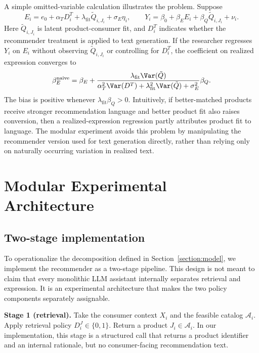 \documentclass[11pt]{article}
\newcommand{\J}{J}
\newcommand{\Y}{Y}
\newcommand{\X}{X}
\newcommand{\Qreg}{D^J}
\newcommand{\catalog}{\mathcal{A}}
\begin{document}
A simple omitted-variable calculation illustrates the problem. Suppose
\begin{equation*}
E_i = e_0 + \alpha_T D_i^T + \lambda_{\mathrm{fit}}\tilde{Q}_{i,\J_i} + \sigma_E\eta_i, \qquad \Y_i = \beta_0 + \beta_E E_i + \beta_Q \tilde{Q}_{i,\J_i} + \nu_i.
\end{equation*}
Here $\tilde{Q}_{i,\J_i}$ is latent product-consumer fit, and $D_i^T$ indicates whether the recommender treatment is applied to text generation. If the researcher regresses $\Y_i$ on $E_i$ without observing $\tilde{Q}_{i,\J_i}$ or controlling for $D_i^T$, the coefficient on realized expression converges to
\begin{equation}
\beta_E^{\mathrm{naive}} = \beta_E + \frac{\lambda_{\mathrm{fit}}\Var(\tilde{Q})}{\alpha_T^2\Var(D^T) + \lambda_{\mathrm{fit}}^2\Var(\tilde{Q}) + \sigma_E^2}\beta_Q.
\label{eq:naive-expression-bias}
\end{equation}
The bias is positive whenever $\lambda_{\mathrm{fit}}\beta_Q > 0$. Intuitively, if better-matched products receive stronger recommendation language and better product fit also raises conversion, then a realized-expression regression partly attributes product fit to language. The modular experiment avoids this problem by manipulating the recommender version used for text generation directly, rather than relying only on naturally occurring variation in realized text.

\section{Modular Experimental Architecture}\label{section:design}

\subsection{Two-stage implementation}

To operationalize the decomposition defined in Section~\ref{section:model}, we implement the recommender as a two-stage pipeline. This design is not meant to claim that every monolithic LLM assistant internally separates retrieval and expression. It is an experimental architecture that makes the two policy components separately assignable.

\textbf{Stage 1 (retrieval).} Take the consumer context $\X_i$ and the feasible catalog $\catalog_i$. Apply retrieval policy $\Qreg_i \in \{0, 1\}$. Return a product $\J_i \in \catalog_i$. In our implementation, this stage is a structured call that returns a product identifier and an internal rationale, but no consumer-facing recommendation text.
\end{document}
